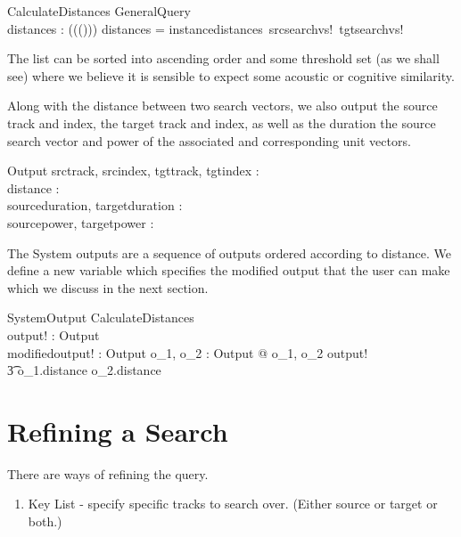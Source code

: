 \documentclass[11pt]{article}
\begin{document}
\begin{enumerate}
\begin{schema}{CalculateDistances}
	GeneralQuery \\
	distances : \seq (\seq (\seq (\seq \R)))
\where
	distances = instancedistances~srcsearchvs!~tgtsearchvs!
\end{schema}

The list can be sorted into ascending order and some threshold set (as we shall see) where we believe it is sensible to expect some acoustic or cognitive similarity. 

Along with the distance between two search vectors, we also output the source track and index,  the target track and index, as well as the duration  the source search vector and power of the associated and corresponding unit vectors. 

\begin{schema}{Output}
	srctrack, srcindex, tgttrack, tgtindex : \nat \\
	distance : \R  \\
	sourceduration, targetduration : \R \\
	sourcepower, targetpower : \R \\
\end{schema} 

The System outputs are a sequence of outputs ordered according to distance. We define a new variable which specifies the modified output that the user can make which we discuss in the next section. 

\begin{schema}{SystemOutput}
	CalculateDistances \\
	output! : \seq Output \\
	modifiedoutput! : \seq Output
\where
	\forall o_1, o_2 : Output @ \langle o_1, o_2 \rangle \inseq output! \\
	\t3 \implies o_1.distance \leq o_2.distance 
\end{schema}

\section{Refining a Search}
\label{s:refining}

There are ways of refining the query. 

\begin{enumerate}

\item \textsf{Key List} -  specify specific tracks to search over.  (Either source or target or both.) 


\end{enumerate}
\end{enumerate}
\end{document}
